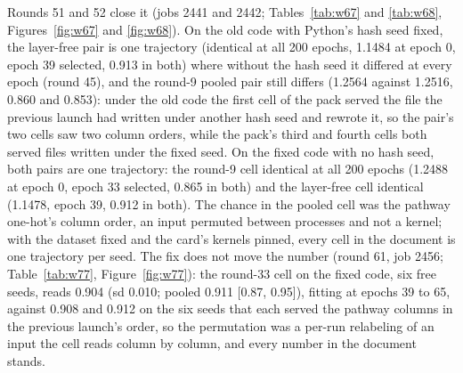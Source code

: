 Rounds 51 and 52 close it (jobs 2441 and 2442; Tables~\ref{tab:w67} and \ref{tab:w68},
Figures~\ref{fig:w67} and \ref{fig:w68}). On the old code with Python's hash seed
fixed, the layer-free pair is one trajectory (identical at all 200 epochs, 1.1484 at
epoch 0, epoch 39 selected, 0.913 in both) where without the hash seed it differed at
every epoch (round 45), and the round-9 pooled pair still differs (1.2564 against
1.2516, 0.860 and 0.853): under the old code the first cell of the pack served the
file the previous launch had written under another hash seed and rewrote it, so the
pair's two cells saw two column orders, while the pack's third and fourth cells both
served files written under the fixed seed. On the fixed code with no hash seed, both
pairs are one trajectory: the round-9 cell identical at all 200 epochs (1.2488 at
epoch 0, epoch 33 selected, 0.865 in both) and the layer-free cell identical (1.1478,
epoch 39, 0.912 in both). The chance in the pooled cell was the pathway one-hot's
column order, an input permuted between processes and not a kernel; with the dataset
fixed and the card's kernels pinned, every cell in the document is one trajectory
per seed. The fix does not move the number (round 61, job 2456;
Table~\ref{tab:w77}, Figure~\ref{fig:w77}): the round-33 cell on the fixed code, six
free seeds, reads 0.904 (sd 0.010; pooled 0.911 [0.87, 0.95]), fitting at epochs 39
to 65, against 0.908 and 0.912 on the six seeds that each served the pathway columns
in the previous launch's order, so the permutation was a per-run relabeling of an
input the cell reads column by column, and every number in the document stands.




